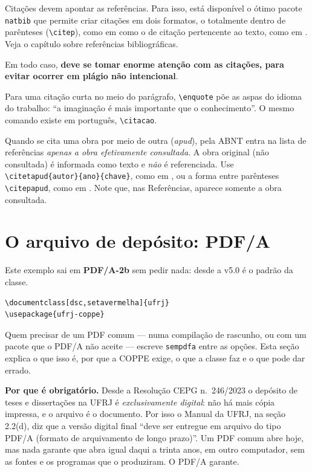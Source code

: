 \documentclass[dsc,setavermelha,numeracaoporcapitulo,linhanafolhaderosto]{ufrj}
\theoremstyle{plain}
\theoremstyle{definition}
\theoremstyle{remark}
\begin{document}
  Citações devem apontar as referências. Para isso, está disponível o ótimo pacote \verb*|natbib| que permite criar citações em dois formatos, o totalmente dentro de parênteses (\verb*|\citep|), como em \citep{article-example} como o de citação pertencente ao texto, como em \citet{article-example}. Veja o capítulo sobre referências bibliográficas.

  Em todo caso, \textbf{deve se tomar enorme atenção com as citações, para evitar ocorrer em plágio não intencional}.

  Para uma citação curta no meio do parágrafo, \verb|\enquote| põe as aspas do idioma do trabalho: \enquote{a imaginação é mais importante que o conhecimento}. O mesmo comando existe em português, \verb|\citacao|.

  Quando se cita uma obra por meio de outra (\textit{apud}), pela ABNT entra na lista de referências \emph{apenas a obra efetivamente consultada}. A obra original (não consultada) é informada como texto e \emph{não} é referenciada. Use \verb*|\citetapud{autor}{ano}{chave}|, como em , ou a forma entre parênteses \verb*|\citepapud|, como em . Note que, nas Referências, aparece somente a obra consultada.

\section{O arquivo de depósito: PDF/A}
\label{sec:pdfa}

Este exemplo sai em \textbf{PDF/A-2b} sem pedir nada: desde a v5.0 é o padrão da classe.
\begin{verbatim}
\documentclass[dsc,setavermelha]{ufrj}
\usepackage{ufrj-coppe}
\end{verbatim}
Quem precisar de um PDF comum --- numa compilação de rascunho, ou com um pacote que o PDF/A não aceite --- escreve \verb|sempdfa| entre as opções. Esta seção explica o que isso é, por que a COPPE exige, o que a classe faz e o que pode dar errado.

\textbf{Por que é obrigatório.} Desde a Resolução CEPG n.~246/2023 o depósito de teses e dissertações na UFRJ é \emph{exclusivamente digital}: não há mais cópia impressa, e o arquivo é o documento. Por isso o Manual da UFRJ, na seção 2.2(d), diz que a versão digital final ``deve ser entregue em arquivo do tipo PDF/A (formato de arquivamento de longo prazo)''. Um PDF comum abre hoje, mas nada garante que abra igual daqui a trinta anos, em outro computador, sem as fontes e os programas que o produziram. O PDF/A garante.
\end{document}

